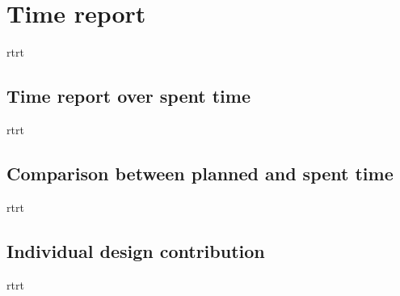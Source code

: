 \section{Time report}
rtrt
\subsection{Time report over spent time}
rtrt
\subsection{Comparison between planned and spent time}
rtrt
\subsection{Individual design contribution}
rtrt